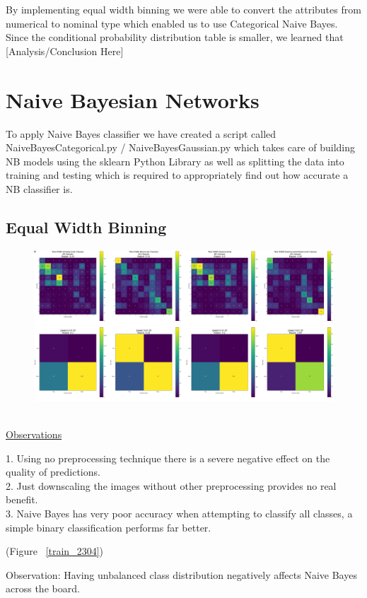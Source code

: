\documentclass[11pt]{article}
\begin{document}
By implementing equal width binning we were able to convert the attributes from numerical to nominal type which enabled us to use Categorical Naive Bayes. 
Since the conditional probability distribution table is smaller, we learned that {\huge [Analysis/Conclusion Here]}

\pagebreak

\section{Naive Bayesian Networks}
To apply Naive Bayes classifier we have created a script called NaiveBayesCategorical.py 
/ NaiveBayesGaussian.py which takes care of building NB models using the sklearn Python Library
as well as splitting the data into training and testing which is required to appropriately find 
out how accurate a NB classifier is.

\subsection{Equal Width Binning}\label{NaiveBayesEWBConfMat}
\begin{figure}[h!]
  \centering
  \includegraphics[scale=0.15]{Images/NaiveBayesEWBMatrices.png}
\end{figure}
{\color{red}{\large IMAGE NEEDS RESIZING TO READ TEXT}}
\\
\underline{Observations}
\par
1. Using no preprocessing technique there is a severe negative effect on the quality of predictions. \\
2. Just downscaling the images without other preprocessing provides no real benefit. \\
3. Naive Bayes has very poor accuracy when attempting to classify all classes, a simple binary classification performs far better.

\par
(Figure ~\ref{train_2304})
\par
Observation: Having unbalanced class distribution negatively affects Naive Bayes across the board.
\end{document}

